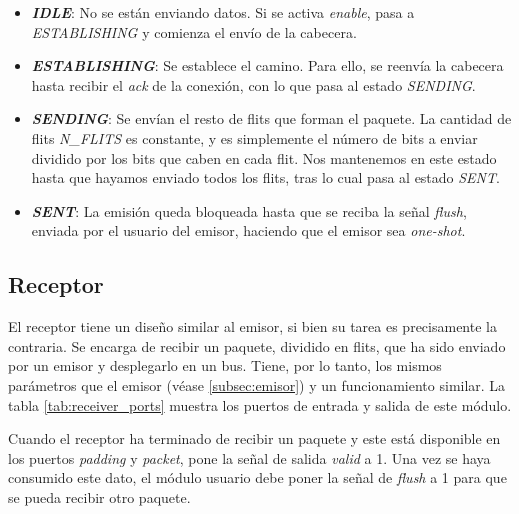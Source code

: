 \begin{itemize}
    \item \textbf{\textit{IDLE}}: No se están enviando datos. Si se activa \textit{enable}, pasa a \textit{ESTABLISHING} y comienza el envío de la cabecera.
    \item \textbf{\textit{ESTABLISHING}}: Se establece el camino. Para ello, se reenvía la cabecera hasta recibir el \textit{ack} de la conexión, con lo que pasa al estado \textit{SENDING}.
    \item \textbf{\textit{SENDING}}: Se envían el resto de flits que forman el paquete. La cantidad de flits \textit{N\_FLITS} es constante, y es simplemente el número de bits a enviar dividido por los bits que caben en cada flit. Nos mantenemos en este estado hasta que hayamos enviado todos los flits, tras lo cual pasa al estado \textit{SENT}.
    \item \textbf{\textit{SENT}}: La emisión queda bloqueada hasta que se reciba la señal \textit{flush}, enviada por el usuario del emisor, haciendo que el emisor sea \textit{one-shot}.
\end{itemize}

\subsection{Receptor}
\label{subsec:receptor}
El receptor tiene un diseño similar al emisor, si bien su tarea es precisamente la contraria. Se encarga de recibir un paquete, dividido en flits, que ha sido enviado por un emisor y desplegarlo en un bus. Tiene, por lo tanto, los mismos parámetros que el emisor (véase \ref{subsec:emisor}) y un funcionamiento similar. La tabla \ref{tab:receiver_ports} muestra los puertos de entrada y salida de este módulo.

Cuando el receptor ha terminado de recibir un paquete y este está disponible en los puertos \textit{padding} y \textit{packet}, pone la señal de salida \textit{valid} a 1. Una vez se haya consumido este dato, el módulo usuario debe poner la señal de \textit{flush} a 1 para que se pueda recibir otro paquete.

